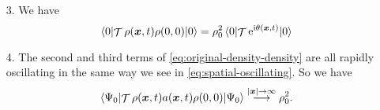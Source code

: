 \documentclass[hyperref, a4paper]{article}
\DeclareMathOperator{\timeorder}{\mathcal{T}}
\newcommand*{\ii}{\mathrm{i}}
\newcommand*{\ee}{\mathrm{e}}
\begin{document}
\begin{enumerate}
\item[3.] We have 
\begin{equation}
    \expval{\timeorder \rho(\vb*{x}, t) \rho(0, 0)}{0} 
    = \rho_0^2 \expval{\timeorder \ee^{\ii \theta(\vb*{x}, t)}}{0}
\end{equation}

\item[4.] The second and third terms of \eqref{eq:original-density-density} 
are all rapidly oscillating in the same way we see in \eqref{eq:spatial-oscillating}.
So we have 
\begin{equation}
    \expval{\timeorder \rho(\vb*{x}, t) a(\vb*{x}, t) \rho(0, 0)}{\Psi_0} 
    \stackrel{\abs{\vb*{x}} \to \infty}{\longrightarrow} \rho_0^2.
\end{equation}

\end{enumerate}
\end{document}
